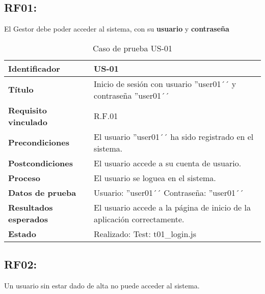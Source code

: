 \subsection{RF01:} El Gestor debe poder acceder al sistema, con su \textbf{usuario} y \textbf{\textbf{contraseña}}
\begin{table}[H]
	\centering
	\renewcommand{\arraystretch}{1.3} 
	\begin{tabularx}{\textwidth}{|l|X|}
		\hline
		\textbf{Identificador} & US-01 \\
		\hline
		\textbf{Título} & Inicio de sesión con usuario ''user01´´ y contraseña ''user01´´ \\
		\hline
		\textbf{Requisito vinculado} & R.F.01 \\
		\hline
		\textbf{Precondiciones} & El usuario ''user01´´ ha sido registrado en el sistema. \\
		\hline
		\textbf{Postcondiciones} & El usuario accede a su cuenta de usuario. \\
		\hline
		\textbf{Proceso} & El usuario se loguea en el sistema. \\
		\hline
		\textbf{Datos de prueba} & Usuario: ''user01´´ Contraseña: ''user01´´ \\
		\hline
		\textbf{Resultados esperados} & El usuario accede a la página de inicio de la aplicación correctamente. \\
		\hline
		\textbf{Estado} & Realizado: Test: t01\_login.js \\
		\hline
	\end{tabularx}
	\caption{Caso de prueba US-01}
	\label{tab:caso_us01}
\end{table}
\subsection{RF02:} Un usuario sin estar dado de alta no puede acceder al sistema.

